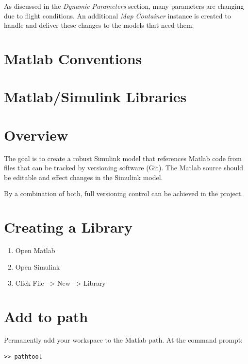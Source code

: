\documentclass[]{book}
\providecommand{\tightlist}{%
  \setlength{\itemsep}{0pt}\setlength{\parskip}{0pt}}
\begin{document}
As discussed in the \emph{Dynamic Parameters} section, many parameters
are changing due to flight conditions. An additional \emph{Map
Container} instance is created to handle and deliver these changes to
the models that need them.

\section{Matlab Conventions}\label{matlab-conventions}

\section{Matlab/Simulink Libraries}\label{matlabsimulink-libraries}

\section{Overview}\label{overview-3}

The goal is to create a robust Simulink model that references Matlab
code from files that can be tracked by versioning software (Git). The
Matlab source should be editable and effect changes in the Simulink
model.

By a combination of both, full versioning control can be achieved in the
project.

\section{Creating a Library}\label{creating-a-library}

\begin{enumerate}
\def\labelenumi{\arabic{enumi}.}
\tightlist
\item
  Open Matlab
\item
  Open Simulink
\item
  Click File --\textgreater{} New --\textgreater{} Library
\end{enumerate}

\section{Add to path}\label{add-to-path}

Permanently add your workspace to the Matlab path. At the command
prompt:

\begin{verbatim}
>> pathtool
\end{verbatim}
\end{document}
